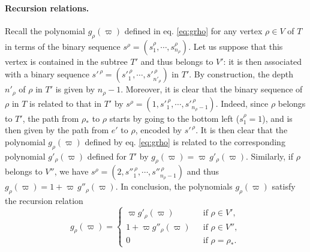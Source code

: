 \documentclass{article}
\begin{document}
\paragraph{Recursion relations.} Recall the polynomial $g_\rho(\varpi)$ defined in eq. \eqref{eq:grho} for any vertex $\rho\in V$ of $T$ in terms of the binary sequence $s^\rho=(s^\rho_1,\cdots,s^\rho_{n_\rho})$. Let us suppose that this vertex is contained in the subtree $T'$ and thus belongs to $V'$: it is then associated with a binary sequence $s'^{\,\rho}=(s'^{\,\rho}_1,\cdots,s'^{\,\rho}_{n'_\rho})$ in $T'$. By construction, the depth $n'_\rho$ of $\rho$ in $T'$ is given by $n_\rho-1$. Moreover, it is clear that the binary sequence of $\rho$ in $T$ is related to that in $T'$ by $s^\rho = (1, s'^{\,\rho}_1,\cdots,s'^{\,\rho}_{n_\rho-1})$. 
Indeed, since $\rho$ belongs to $T'$, the path from $\rho_\ast$ to $\rho$ starts by going to the bottom left ($s^\rho_1=1$), and is then given by the path from $e'$ to $\rho$, encoded by $s'^{\,\rho}$. It is then clear that the polynomial $g_\rho(\varpi)$ defined by eq. \eqref{eq:grho} is related to the corresponding polynomial $g'_\rho(\varpi)$ defined for $T'$ by $g_\rho(\varpi)=\varpi\,g'_\rho(\varpi)$. Similarly, if $\rho$ belongs to $V''$, we have $s^\rho = (2, s''^{\,\rho}_1,\cdots,s''^{\,\rho}_{n_\rho-1})$ and thus $g_\rho(\varpi)=1+\varpi\,g''_\rho(\varpi)$. In conclusion, the polynomials $g_\rho(\varpi)$ satisfy the recursion relation
\begin{equation}\label{eq:gRec}
g_\rho(\varpi) = \left\lbrace \begin{array}{ll}
\varpi g'_\rho(\varpi) & \text{ if } \rho\in V', \\
1+\varpi g''_\rho(\varpi) \:\,& \text{ if } \rho\in V'', \\
0 & \text{ if } \rho=\rho_{\ast}.
\end{array} \right.
\end{equation}
\end{document}
